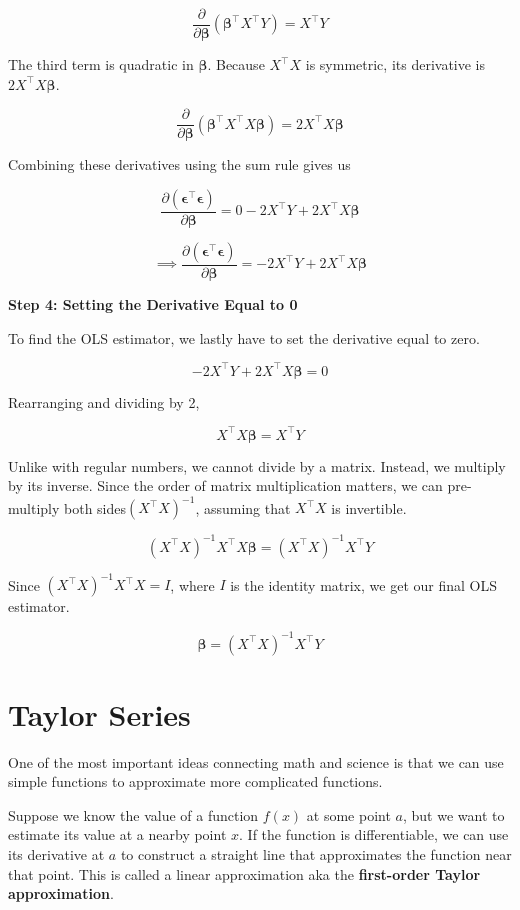 \documentclass[12pt]{article}
\begin{document}
\[
\frac{\partial}{\partial \boldsymbol{\beta}}
(\boldsymbol{\beta}^{\top}X^{\top}Y)
= X^{\top}Y
\]

The third term is quadratic in $\boldsymbol{\beta}$.
Because $X^{\top}X$ is symmetric, its derivative is
$2X^{\top}X\boldsymbol{\beta}$.

\[
\frac{\partial}{\partial \boldsymbol{\beta}}
(\boldsymbol{\beta}^{\top}X^{\top}X\boldsymbol{\beta})
= 2X^{\top}X\boldsymbol{\beta}
\]

Combining these derivatives using the sum rule gives us

\[
\frac{\partial
(\boldsymbol{\epsilon}^{\top}\boldsymbol{\epsilon})}
{\partial \boldsymbol{\beta}}
=
0 - 2X^{\top}Y + 2X^{\top}X\boldsymbol{\beta}
\]

\[ \implies 
\frac{\partial
(\boldsymbol{\epsilon}^{\top}\boldsymbol{\epsilon})}
{\partial \boldsymbol{\beta}}
=
- 2X^{\top}Y + 2X^{\top}X\boldsymbol{\beta}
\]

\textbf{Step 4: Setting the Derivative Equal to 0}

To find the OLS estimator, we lastly have to set the derivative equal
to zero.

\[
-2X^{\top}Y + 2X^{\top}X\boldsymbol{\beta} = 0
\]

Rearranging and dividing by 2,

\[
X^{\top}X\boldsymbol{\beta} = X^{\top}Y
\]

Unlike with regular numbers, we cannot divide by a matrix.
Instead, we multiply by its inverse. Since the order of matrix multiplication matters, we can pre-multiply both sides$(X^{\top}X)^{-1}$, assuming that $X^{\top}X$ is invertible.

\[
(X^{\top}X)^{-1}X^{\top}X\boldsymbol{\beta}
=
(X^{\top}X)^{-1}X^{\top}Y
\]

Since $(X^{\top}X)^{-1}X^{\top}X = I$, where $I$ is
the identity matrix, we get our final OLS estimator. 

\[
\boxed{
\boldsymbol{\beta}
=
(X^{\top}X)^{-1}X^{\top}Y
}
\]


\section{Taylor Series}

One of the most important ideas connecting math
and science is that we can use simple functions to approximate more complicated functions.

Suppose we know the value of a function $f(x)$ at some
point $a$, but we want to estimate its value at a
nearby point $x$. If the function is differentiable, we can use its
derivative at $a$ to construct a straight line that
approximates the function near that point. This is called a linear approximation aka
the \textbf{first-order Taylor approximation}.
\end{document}

